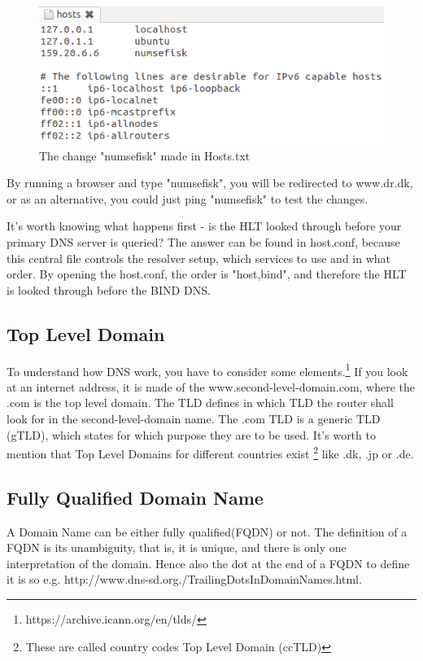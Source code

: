 \begin{figure}[ht!]
\centering
\includegraphics[width=150mm]{img/hostsText.png}
\caption{The change "numsefisk" made in Hosts.txt}
\label{hostsText}
\end{figure}

By running a browser and type "numsefisk", you will be redirected to www.dr.dk, or as an alternative, you could just ping "numsefisk" to test the changes.

It's worth knowing what happens first - is the HLT looked through before your primary DNS server is queried?
The answer can be found in host.conf, because this central file controls the resolver setup, which services to use and in what order. By opening the host.conf, the order is "host,bind", and therefore the HLT is looked through before the BIND DNS.


\subsection{Top Level Domain}
To understand how DNS work, you have to consider some elements.\footnote{https://archive.icann.org/en/tlds/} If you look at an internet address, it is made of the www.second-level-domain.com, where the .com is the top level domain. The TLD defines in which TLD the router shall look for in the second-level-domain name.
The .com TLD is a generic TLD (gTLD), which states for which purpose they are to be used. It's worth to mention that Top Level Domains for different countries exist \footnote{These are called country codes Top Level Domain (ccTLD)} like .dk, .jp or .de.

\subsection{Fully Qualified Domain Name}
A Domain Name can be either fully qualified(FQDN) or not. The definition of a FQDN is its unambiguity, that is, it is unique, and there is only one interpretation of the domain. Hence also the dot at the end of a FQDN to define it is so e.g. http://www.dns-sd.org./TrailingDotsInDomainNames.html.

